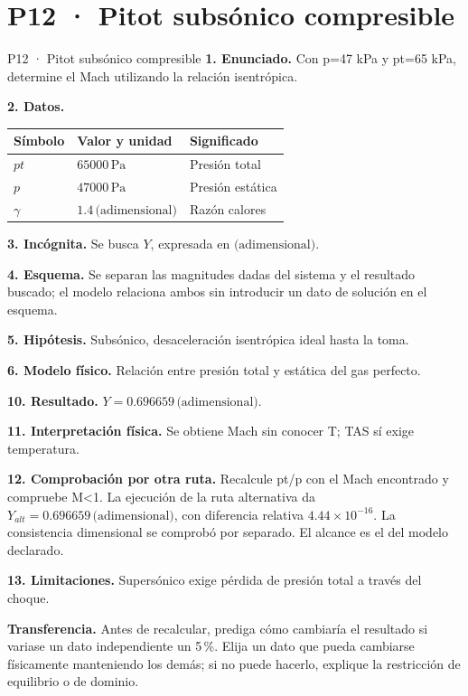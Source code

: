 \chapter*{P12 · Pitot subsónico compresible}
\begin{studiumworked}{P12 · Pitot subsónico compresible}
\textbf{1. Enunciado.} Con p=47 kPa y pt=65 kPa, determine el Mach utilizando la relación isentrópica.

\textbf{2. Datos.}
\begin{longtable}{p{.16\linewidth}p{.35\linewidth}p{.38\linewidth}}\toprule Símbolo & Valor y unidad & Significado\\\midrule\endhead
$pt$ & $65000\,\mathrm{Pa}$ & Presión total\\
$p$ & $47000\,\mathrm{Pa}$ & Presión estática\\
$\gamma$ & $1.4\,\text{(adimensional)}$ & Razón calores\\
\bottomrule\end{longtable}
\textbf{3. Incógnita.} Se busca $Y$, expresada en $\text{(adimensional)}$.

\textbf{4. Esquema.} Se separan las magnitudes dadas del sistema y el resultado buscado; el modelo relaciona ambos sin introducir un dato de solución en el esquema.

\textbf{5. Hipótesis.} Subsónico, desaceleración isentrópica ideal hasta la toma.

\textbf{6. Modelo físico.} Relación entre presión total y estática del gas perfecto.


\textbf{10. Resultado.} $Y=0.696659\,\text{(adimensional)}$.

\textbf{11. Interpretación física.} Se obtiene Mach sin conocer T; TAS sí exige temperatura.

\textbf{12. Comprobación por otra ruta.} Recalcule pt/p con el Mach encontrado y compruebe M<1. La ejecución de la ruta alternativa da $Y_{alt}=0.696659\,\text{(adimensional)}$, con diferencia relativa $4.44\times10^{-16}$. La consistencia dimensional se comprobó por separado. El alcance es el del modelo declarado.

\textbf{13. Limitaciones.} Supersónico exige pérdida de presión total a través del choque.

\textbf{Transferencia.} Antes de recalcular, prediga cómo cambiaría el resultado si variase un dato independiente un 5\,\%. Elija un dato que pueda cambiarse físicamente manteniendo los demás; si no puede hacerlo, explique la restricción de equilibrio o de dominio.\par
\end{studiumworked}
